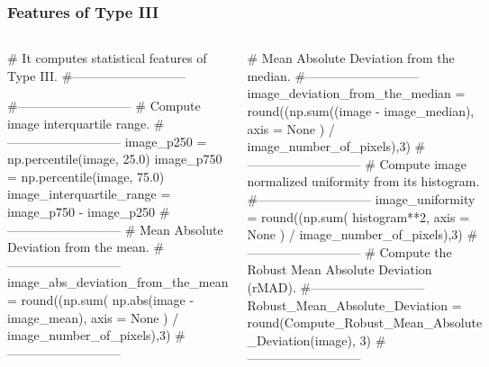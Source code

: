 \begin{frame}[fragile]
    \frametitle{Features of Type III}
\begin{columns}
    \begin{roundedcodebox}
    \begin{python}  
    # It computes statistical features of Type III.
    #---------------------------  
      
    #---------------------------
    # Compute image interquartile range.
    #---------------------------
    image_p250 = np.percentile(image, 25.0)
    image_p750 = np.percentile(image, 75.0)      
    image_interquartile_range = image_p750 - image_p250
    #---------------------------
    # Mean Absolute Deviation from the mean.
    #---------------------------
    image_abs_deviation_from_the_mean = round((np.sum( np.abs(image - image_mean), axis = None ) / image_number_of_pixels),3)
    #---------------------------
    
\end{python}
\end{roundedcodebox}
    \begin{roundedcodebox}
    \begin{python}  
    # Mean Absolute Deviation from the median.
    #---------------------------
    image_deviation_from_the_median = round((np.sum((image - image_median), axis = None ) / image_number_of_pixels),3)  
    #---------------------------
    # Compute image normalized uniformity from its histogram.
    #---------------------------        
    image_uniformity = round((np.sum( histogram**2, axis = None ) / image_number_of_pixels),3)          
    #---------------------------
    # Compute the Robust Mean Absolute Deviation (rMAD).
    #--------------------------- 
    Robust_Mean_Absolute_Deviation = round(Compute_Robust_Mean_Absolute
    _Deviation(image), 3)
    #---------------------------
   
\end{python}
\end{roundedcodebox}
    \end{columns}
\end{frame}


